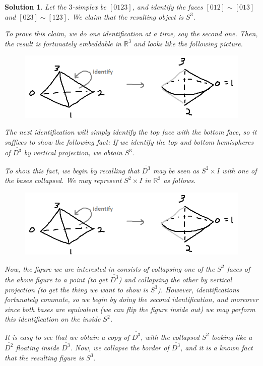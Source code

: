 \documentclass{article}
\theoremstyle{plain}
\theoremstyle{nonumberplain}
\newtheorem{sol}{Solution}
\newcommand{\R}{\mathbb{R}}
\newcommand{\close}[1]{\overline{#1}}
\begin{document}
\begin{sol}
Let the $3$-simplex be $[0123]$, and identify the faces $[012] \sim [013]$ and $[023] \sim [123]$. We claim that the resulting object is $S^3$.

To prove this claim, we do one identification at a time, say the second one. Then, the result is fortunately embeddable in $\R^3$ and looks like the following picture.
\begin{figure}[H]
\centering
\includegraphics[width=\linewidth]{s31}
\end{figure}

The next identification will simply identify the top face with the bottom face, so it suffices to show the following fact: If we identify the top and bottom hemispheres of $\close {D^3}$ by vertical projection, we obtain $S^3$.

To show this fact, we begin by recalling that $\close{D^3}$ may be seen as $S^2 \times I$ with one of the bases collapsed. We may represent $S^2 \times I$ in $\R^3$ as follows.
\begin{figure}[H]
\centering
\includegraphics[width=\linewidth]{s31}
\end{figure}

Now, the figure we are interested in consists of collapsing one of the $S^2$ faces of the above figure to a point (to get $\close{D^3}$) and collapsing the other by vertical projection (to get the thing we want to show is $S^3$). However, identifications fortunately commute, so we begin by doing the second identification, and moreover since both bases are equivalent (we can flip the figure inside out) we may perform this identification on the inside $S^2$.

It is easy to see that we obtain a copy of $\close{D^3}$, with the collapsed $S^2$ looking like a $\close{D^2}$ floating inside $\close{D^3}$. Now, we collapse the border of $\close{D^3}$, and it is a known fact that the resulting figure is $S^3$.


\end{sol}
\end{document}
